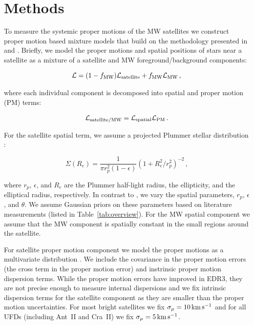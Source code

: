 \documentclass[twocolumn]{aastex63}
\begin{document}
\section{Methods}
\label{section:methods}

To measure the systemic proper motions of the MW satellites we construct proper motion based mixture models that build on the methodology presented in \citet{Pace2019ApJ...875...77P} and \citet{McConnachie2020AJ....160..124M}.
Briefly, we model the proper motions and spatial positions of stars near a satellite as a mixture of a satellite and MW foreground/background components: 

\begin{equation}
\mathcal{L} = (1 - f_{\rm MW}) \mathcal{L}_{\rm satellite} + f_{\rm MW} \mathcal{L}_{\rm MW} \, , \\ 
\end{equation}

\noindent where each individual component is decomposed into spatial and proper motion (PM) terms:

\begin{equation}
\mathcal{L}_{\rm satellite/MW} = \mathcal{L}_{\rm spatial} \mathcal{L}_{\rm PM} \, . \\ 
\end{equation}

For the satellite spatial term, we assume a projected Plummer stellar distribution \citep[][]{Plummer1911MNRAS..71..460P}:

\begin{equation}
\Sigma (R_e) = \frac{1}{\pi r_p^2 (1-\epsilon)}(1 + R_e^2/r_p^2)^{-2} \,, 
\end{equation}

\noindent where $r_p$,  $\epsilon$, and $R_e$ are the Plummer half-light radius, the ellipticity, and the elliptical radius, respectively.
In contrast to \citet{Pace2019ApJ...875...77P}, we vary the spatial parameters,  $r_p$, $\epsilon$, and $\theta$.
We assume Gaussian priors on these parameters based on literature measurements (listed in Table~\ref{tab:overview}).
For the MW spatial component we assume that the MW component is spatially constant in the small regions around the satellite.

For satellite proper motion component we model the proper motions as a multivariate distribution \citep[e.g.,][]{Pace2019ApJ...875...77P}.  We include the covariance in the proper motion errors (the cross term in the proper motion error) and instrinsic proper motion dispersion terms. 
While the proper motion errors have improved in EDR3, they are not precise enough to measure internal dispersions and we fix intrinsic dispersion terms for the satellite component as they are smaller than the proper motion uncertainties.
For most bright satellites we fix  $\sigma_\mu=10 \mathrm{\,km} \mathrm{\,s}^{-1}$ and for all UFDs (including Ant~II and Cra~II) we fix $\sigma_\mu=5 \mathrm{\,km} \mathrm{\,s}^{-1}$.
\end{document}

